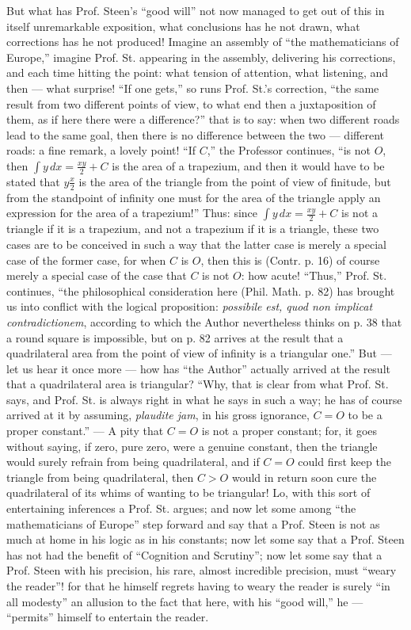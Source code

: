 \documentclass[12pt,a4paper,openany]{book}
\newcommand{\opage}[1]{\marginnote{\footnotesize\textit{[#1]}}}
\begin{document}
But what has Prof. Steen's ``good will'' not now
managed to get out of this in itself unremarkable exposition, what conclusions has he not drawn, what corrections has he not produced! Imagine an assembly of ``the mathematicians of Europe,'' imagine
Prof. St. appearing in the assembly, delivering his corrections,
and each time hitting the point: what tension of
attention, what listening, and then --- what surprise!
``If one gets,'' so runs Prof. St.'s correction, ``the
same result from two different points of view, to what end then
a juxtaposition of them, as if here there were a difference?''
that is to say: when two different roads lead to the same goal,
then there is no difference between the two --- different roads:
a fine remark, a lovely point! ``If $C$,'' the Professor continues, ``is not $O$, then $\int y\,dx = \frac{xy}{2} + C$
is the area of a trapezium, and then it would have to be stated that
$y\frac{x}{2}$ is the area of the triangle from the point of view of finitude,
but from the standpoint of infinity one must
for the area of the triangle apply an expression for
the area of a trapezium!'' Thus: since
$\int y\,dx = \frac{xy}{2} + C$ is not a triangle if it is a
trapezium, and not a trapezium if it is a
triangle, these two cases are to be conceived in such a way that
the latter case is merely a special case of the former
case, for when $C$ is $O$, then this is (Contr. p. 16)
of course merely a special case of the case that $C$
\opage{35}\setcounter{footnote}{0}%
is not $O$: how acute! ``Thus,'' Prof.
St. continues, ``the philosophical consideration here (Phil. Math.
p. 82) has brought us into conflict with the logical proposition: \textit{possibile}
\textit{est, quod non implicat contradictionem}, according to which the Author
nevertheless thinks on p. 38 that a round square is impossible, but on p. 82
arrives at the result that a quadrilateral area from the point of view of infinity
is a triangular one.'' But --- let us hear it once more ---
how has ``the Author'' actually arrived at the result that a quadrilateral
area is triangular? ``Why, that is clear from what Prof.
St. says, and Prof. St. is always right in what he
says in such a way; he has of course arrived at it by
assuming, \textit{plaudite jam}, in his gross ignorance, $C = O$
to be a proper constant.'' --- A pity that $C = O$
is not a proper constant; for, it goes without saying, if
zero, pure zero, were a genuine constant, then the triangle
would surely refrain from being quadrilateral, and if $C = O$ could first
keep the triangle from being quadrilateral, then $C > O$
would in return soon cure the quadrilateral of its whims of
wanting to be triangular! Lo, with this sort of entertaining
inferences a Prof. St. argues; and now let
some among ``the mathematicians of Europe'' step forward and say that
a Prof. Steen is not as much at home in his logic as
in his constants; now let some say that a Prof. Steen
has not had the benefit of ``Cognition and Scrutiny''; now let
some say that a Prof. Steen with his precision,
his rare, almost incredible precision, must ``weary the reader''!
for that he himself regrets having to weary the reader is surely
``in all modesty'' an allusion to the fact that here, with
his ``good will,'' he --- ``permits'' himself to entertain the reader.
\end{document}
